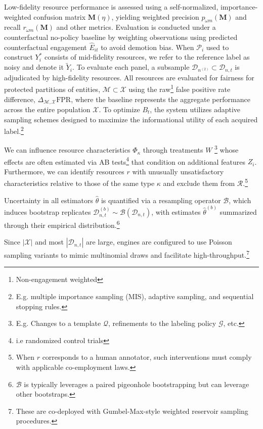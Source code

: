 \documentclass[12pt]{article}
\begin{document}
Low-fidelity resource performance is assessed using a self-normalized, importance-weighted confusion matrix $\mathbf{M}(\eta)$, yielding weighted precision $p_{\omega m}(\mathbf{M})$ and recall $r_{\omega m}(\mathbf{M})$ and other metrics. Evaluation is conducted under a counterfactual no-policy baseline by weighting observations using predicted counterfactual engagement $\widehat{E}_{it}$ to avoid demotion bias. When $\mathcal{P}_i$ used to construct $Y_i^*$ consists of mid-fidelity resources, we refer to the reference label as noisy and denote it $\tilde{Y}_i$. To evaluate each panel, a subsample $\mathcal{D}_{n^{(2)}} \subset \mathcal{D}_{n,t}$ is adjudicated by high-fidelity resources. All resources are evaluated for fairness for protected partitions of entities, $\mathcal{M} \subset \mathcal{X}$ using the raw\footnote{Non-engagement weighted} false positive rate difference, $\Delta_{\mathcal{M},\mathcal{X}}\text{FPR}$, where the baseline represents the aggregate performance across the entire population $\mathcal{X}$. To optimize $B_{t}$, the system utilizes adaptive sampling schemes designed to maximize the informational utility of each acquired label.\footnote{E.g. multiple importance sampling (MIS), adaptive sampling, and sequential stopping rules.}

We can influence resource characteristics $\Phi_{\kappa}$ through treatments $W$ \footnote{E.g. Changes to a template $\mathcal{Q}$, refinements to the labeling policy $\mathcal{G}$, etc.} whose effects are often estimated via AB tests\footnote{i.e randomized control trials} that condition on additional features $Z_{i}$. Furthermore, we can identify resources $r$ with unusually unsatisfactory characteristics relative to those of the same type $\kappa$ and exclude them from $\mathcal{R}$.\footnote{When $r$ corresponds to a human annotator, such interventions must comply with applicable co-employment laws.}

Uncertainty in all estimators $\hat{\theta}$ is quantified via a resampling operator $\mathcal{B}$, which induces bootstrap replicates $\mathcal{D}^{(b)}_{n,t} \sim \mathcal{B}(\mathcal{D}_{n,t})$, with estimates $\hat{\theta}^{(b)}$ summarized through their empirical distribution.\footnote{$\mathcal{B}$ is typically leverages a paired pigeonhole bootstrapping but can leverage other bootstraps.} 

Since $|\mathcal{X}|$ and most $|\mathcal{D}_{n,t}|$ are large, engines are configured to use Poisson sampling variants to mimic multinomial draws and facilitate high-throughput.\footnote{These are co-deployed with Gumbel-Max-style weighted reservoir sampling procedures.}
\end{document}
